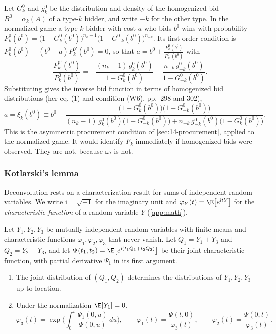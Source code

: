 Let $G^0_k$ and $g^0_k$ be the distribution and density of the homogenized bid $B^0=\alpha_k(A)$ of a
type-$k$ bidder, and write $-k$ for the other type. In the normalized game a type-$k$ bidder with cost
$a$ who bids $b^0$ wins with probability
$P^0_k(b^0)=\big(1-G^0_k(b^0)\big)^{n_k-1}\big(1-G^0_{-k}(b^0)\big)^{n_{-k}}$. Its first-order condition is
$P^0_k(b^0)+(b^0-a)P^{0\prime}_k(b^0)=0$, so that $a=b^0+\frac{P^0_k(b^0)}{P^{0\prime}_k(b^0)}$ with
\[
\frac{P^{0\prime}_k(b^0)}{P^0_k(b^0)}=-\frac{(n_k-1)\,g^0_k(b^0)}{1-G^0_k(b^0)}-\frac{n_{-k}\,g^0_{-k}(b^0)}{1-G^0_{-k}(b^0)} .
\]
Substituting gives the inverse bid function in terms of homogenized bid distributions (her eq. (1)
and condition (W6), pp.~298 and 302),
\begin{equation}\label{eq:15-krasno-inverse}
a=\xi_k(b^0)\equiv b^0-\frac{\big(1-G^0_k(b^0)\big)\big(1-G^0_{-k}(b^0)\big)}{(n_k-1)\,g^0_k(b^0)\big(1-G^0_{-k}(b^0)\big)+n_{-k}\,g^0_{-k}(b^0)\big(1-G^0_k(b^0)\big)} .
\end{equation}
This is the asymmetric procurement condition of \cref{sec:14-procurement}, applied to the normalized
game. It would identify $F_k$ immediately if homogenized bids were observed. They are not, because
$\omega_t$ is not.

\subsubsection{Kotlarski's lemma}

Deconvolution rests on a characterization result for sums of independent random variables. We write
$\mathrm i=\sqrt{-1}$ for the imaginary unit and $\varphi_Y(t)=\E\big[e^{\mathrm i tY}\big]$ for the
\emph{characteristic function} of a random variable $Y$ (\cref{app:math}).

\begin{lemma}\label{lem:15-kotlarski}
Let $Y_1,Y_2,Y_3$ be mutually independent random variables with finite means and characteristic
functions $\varphi_1,\varphi_2,\varphi_3$ that never vanish. Let $Q_1=Y_1+Y_3$ and $Q_2=Y_2+Y_3$, and let
$\Psi(t_1,t_2)=\E\big[e^{\mathrm i(t_1Q_1+t_2Q_2)}\big]$ be their joint characteristic function, with
partial derivative $\Psi_1$ in its first argument.
\begin{enumerate}[label=(\roman*)]
\item The joint distribution of $(Q_1,Q_2)$ determines the distributions of $Y_1,Y_2,Y_3$ up to
location.
\item Under the normalization $\E[Y_1]=0$,
\begin{equation}\label{eq:15-kotlarski}
\varphi_3(t)=\exp\Big(\int_0^t\frac{\Psi_1(0,u)}{\Psi(0,u)}\,du\Big),\qquad
\varphi_1(t)=\frac{\Psi(t,0)}{\varphi_3(t)},\qquad \varphi_2(t)=\frac{\Psi(0,t)}{\varphi_3(t)} .
\end{equation}
\end{enumerate}
\end{lemma}

